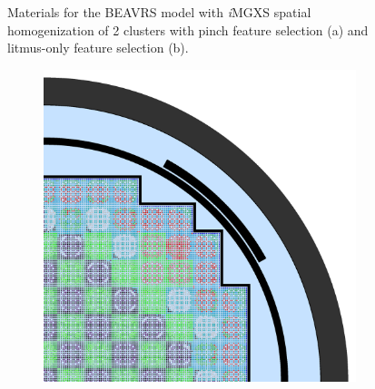 \begin{figure}[h!]
\begin{subfigure}{0.67\textwidth}
  \caption{}
  \label{fig:chap10-full-core-combined-2}
\end{subfigure}
\caption[Clustered geometries for BEAVRS]{Materials for the \ac{BEAVRS} model with \textit{i}\ac{MGXS} spatial homogenization of 2 clusters with pinch feature selection (a) and litmus-only feature selection (b).}
\label{fig:chap10-full-core-geometries-2}
\end{figure}

\clearpage

\begin{figure}[h!]
\centering
\begin{subfigure}{0.67\textwidth}
  \centering
  \includegraphics[width=\linewidth]{figures/unsupervised/geometries/with-features/4-clusters/pinch/full-core}
  \caption{}
  \label{fig:chap10-full-core-pinch-4}
\end{subfigure}
\begin{subfigure}{0.67\textwidth}
  \centering

\end{subfigure}
\end{figure}
